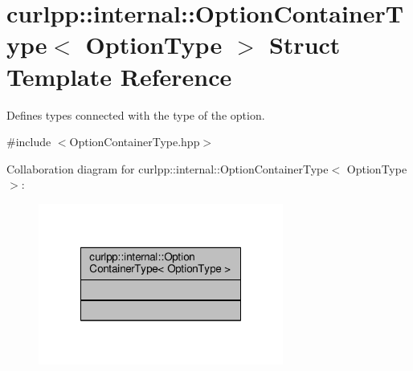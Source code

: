 \hypertarget{structcurlpp_1_1internal_1_1OptionContainerType}{\section{curlpp\-:\-:internal\-:\-:Option\-Container\-Type$<$ Option\-Type $>$ Struct Template Reference}
\label{structcurlpp_1_1internal_1_1OptionContainerType}
}


Defines types connected with the type of the option.  




{\ttfamily \#include $<$Option\-Container\-Type.\-hpp$>$}



Collaboration diagram for curlpp\-:\-:internal\-:\-:Option\-Container\-Type$<$ Option\-Type $>$\-:
\nopagebreak
\begin{figure}[H]
\begin{center}
\leavevmode
\includegraphics[width=228pt]{structcurlpp_1_1internal_1_1OptionContainerType__coll__graph}
\end{center}
\end{figure}
